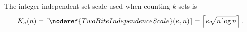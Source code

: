 \begin{definition}
The integer independent-set scale used when counting \(k\)-sets is
\[
K_\kappa(n)=\left\lceil
\noderef{TwoBiteIndependenceScale}(\kappa,n)\right\rceil
=\left\lceil \kappa\sqrt{n\log n}\right\rceil .
\]
\end{definition}
